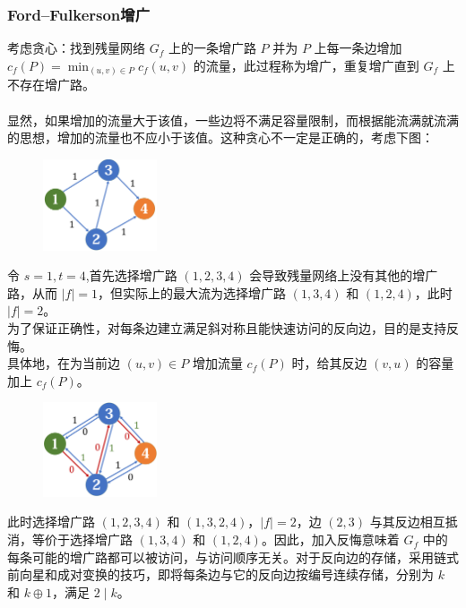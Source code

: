 \documentclass[12pt,a4paper]{article}
\begin{document}
\subsubsection{Ford–Fulkerson增广}
考虑贪心：找到残量网络 $G_f$ 上的一条增广路 $P$ 并为 $P$ 上每一条边增加 $\displaystyle c_f(P)=\min_{(u,v)\in P}c_f(u,v)$ 的流量，此过程称为增广，重复增广直到 $G_f$ 上不存在增广路。\\\\
显然，如果增加的流量大于该值，一些边将不满足容量限制，而根据能流满就流满的思想，增加的流量也不应小于该值。这种贪心不一定是正确的，考虑下图：
\begin{figure}[H]
	\centering
	\includegraphics[width=0.3\textwidth]{maxflow1.png}
\end{figure}
\noindent 令 $s=1, t=4$,首先选择增广路 $(1,2,3,4)$ 会导致残量网络上没有其他的增广路，从而 $|f|=1$，但实际上的最大流为选择增广路 $(1,3,4)$ 和 $(1,2,4)$，此时 $|f|=2$。\\
为了保证正确性，对每条边建立满足斜对称且能快速访问的反向边，目的是支持反悔。\\
具体地，在为当前边 $(u,v)\in P$ 增加流量 $c_f(P)$ 时，给其反边 $(v,u)$ 的容量加上 $c_f(P)$。\\
\begin{figure}[H]
	\centering
	\includegraphics[width=0.3\textwidth]{maxflow2.png}
\end{figure}
\noindent 此时选择增广路 $(1,2,3,4)$ 和 $(1,3,2,4)$，$|f|=2$，边 $(2,3)$ 与其反边相互抵消，等价于选择增广路 $(1,3,4)$ 和 $(1,2,4)$。因此，加入反悔意味着 $G_f$ 中的每条可能的增广路都可以被访问，与访问顺序无关。对于反向边的存储，采用链式前向星和成对变换的技巧，即将每条边与它的反向边按编号连续存储，分别为 $k$ 和 $k\oplus1$，满足 $2\mid k$。
\end{document}
